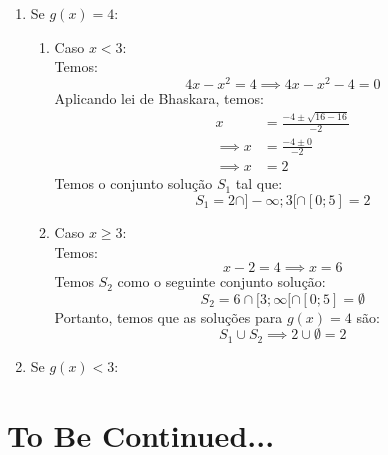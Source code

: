 \documentclass[13pt,letterpaper]{article}
\begin{document}
\begin{enumerate}
\begin{enumerate}
        \item Se $g(x) = 4$:
        \begin{enumerate}
            \item Caso $x < 3$: \\
                Temos:
                \begin{displaymath}
                    4x - x^2 = 4 \implies 4x - x^2 - 4 = 0
                \end{displaymath}
                Aplicando lei de Bhaskara, temos:
                \begin{align*}
                    x &= \frac{-4 \pm \sqrt{16 - 16}}{-2} \\ \implies
                    x &= \frac{-4 \pm 0}{-2} \\ \implies 
                    x &= 2
                \end{align*}
                Temos o conjunto solução $S_1$ tal que:
                \begin{displaymath}
                    S_1 = 2 \cap ]-\infty; 3[ \cap [0; 5] = 2
                \end{displaymath}
            \item Caso $x \ge 3$: \\
                Temos:
                \begin{displaymath}
                    x - 2 = 4 \implies x = 6
                \end{displaymath}
                Temos $S_2$ como o seguinte conjunto solução:
                \begin{displaymath}
                    S_2 = 6 \cap [3; \infty[ \cap [0; 5] = \emptyset
                \end{displaymath}
                Portanto, temos que as soluções para $g(x) = 4$ são:
                \begin{displaymath}
                    S_1 \cup S_2 \implies 2 \cup \emptyset = 2
                \end{displaymath}
            \end{enumerate}
        \item Se $g(x) < 3$:
            
        \end{enumerate}
\end{enumerate}

\section{To Be Continued...}
\end{document}
